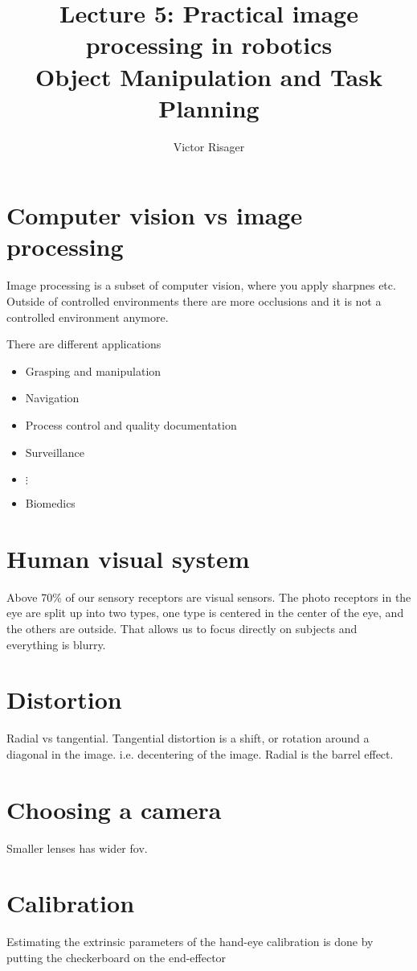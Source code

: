 \documentclass[a4paper]{article}
\title{Lecture 5: Practical image processing in robotics  \\
	\large Object Manipulation and Task Planning}
\author{Victor Risager}
\begin{document}
\maketitle

\section{Computer vision vs image processing}
Image processing is a subset of computer vision, where you apply sharpnes etc. Outside of controlled environments there are more occlusions and it is not a controlled environment anymore. 

\vspace{5pt}

There are different applications
\begin{itemize}
	\item Grasping and manipulation
	\item Navigation
	\item Process control and quality documentation
	\item Surveillance
	\item $ \vdots $
	\item Biomedics
\end{itemize}

\section{Human visual system}
Above 70\% of our sensory receptors are visual sensors. 
The photo receptors in the eye are split up into two types, one type is centered in the center of the eye, and the others are outside. That allows us to focus directly on subjects and everything is blurry. 

\section{Distortion}
Radial vs tangential. Tangential distortion is a shift, or rotation around a diagonal in the image. i.e. decentering of the image. 
Radial is the barrel effect. 

\section{Choosing a camera}
Smaller lenses has wider fov. 

\section{Calibration}
Estimating the extrinsic parameters of the hand-eye calibration is done by putting the checkerboard on the end-effector
\end{document}
